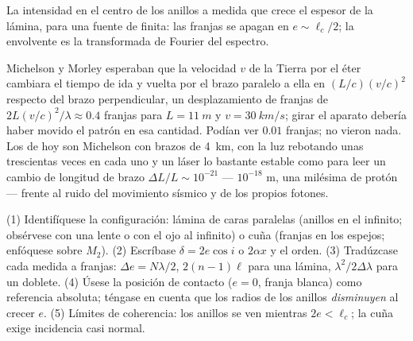 \begin{omfigure}

{\small La intensidad en el centro de los anillos a medida que crece el espesor de la
lámina, para una fuente de  finita: las franjas se apagan en
$e \sim \ell_c/2$; la envolvente es la transformada de Fourier del espectro.}
\end{omfigure}

\begin{remark}\label{rem:b2:michelson:history}
Michelson y Morley esperaban que la velocidad $v$ de la Tierra por el
éter cambiara el tiempo de ida y vuelta por el brazo paralelo a ella en
$(L/c)(v/c)^2$ respecto del brazo perpendicular, un desplazamiento de franjas de
$2L(v/c)^2/\lambda \approx 0.4$ franjas para $L = \qty{11}{m}$ y $v = \qty{30}{km/s}$;
girar el aparato debería haber movido el patrón en esa cantidad.
Podían ver $0.01$ franjas; no vieron nada. Los  de hoy son Michelson con brazos de \qty{4}{km}, con la luz rebotando
unas trescientas veces en cada uno y un láser lo bastante estable como para leer un
cambio de longitud de brazo $\Delta L/L \sim 10^{-21}$ --- $10^{-18}$ m, una milésima
de protón --- frente al ruido del movimiento sísmico y de los propios
fotones.
\end{remark}

\begin{method}\label{met:b2:michelson:method}
(1) Identifíquese la configuración: lámina de caras paralelas (anillos en el infinito;
obsérvese con una lente o con el ojo al infinito) o cuña (franjas en los
espejos; enfóquese sobre $M_2$). (2) Escríbase $\delta = 2e\cos i$ o $2\alpha x$ y el
orden. (3) Tradúzcase cada medida a franjas: $\Delta e = N\lambda/2$,
$2(n - 1)\ell$ para una lámina, $\lambda^2/2\Delta\lambda$ para un doblete. (4) Úsese la
posición de contacto ($e = 0$, franja blanca) como referencia absoluta;
téngase en cuenta que los radios de los anillos \emph{disminuyen} al crecer $e$. (5) Límites
de coherencia: los anillos se ven mientras $2e < \ell_c$; la cuña exige
incidencia casi normal.
\end{method}

